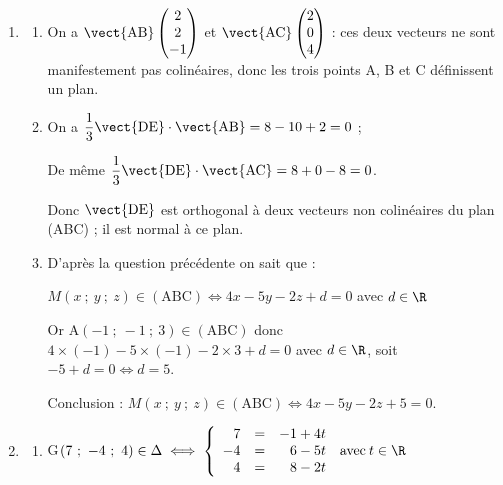 \begin{enumerate}
\begin{enumerate}
		\item 
		F$(1,36~;~-1,7~;~-0,7) \in\Delta' \iff \left\{\begin{array}{l c l}
1,36&=&\phantom{-}4t\\
-1,7&=&-5t \quad\text{avec}\: t \in \R\\
-0,7&=& -2t
\end{array}\right.$

Les deux premières équations donnent $t = 0,34$ et la dernière $t = 0,35$. \\
Donc F $\notin \Delta$.
	\end{enumerate}	
\item
	\begin{enumerate}
		\item 
		On a $\vect{\text{AB}}\begin{pmatrix}2\\2\\-1\end{pmatrix}$ et $\vect{\text{AC}}\begin{pmatrix}2\\0\\4\end{pmatrix}$ : ces deux vecteurs ne sont manifestement pas colinéaires, donc les trois points A, B et C définissent un plan.
		\item 
On a $\dfrac13\vect{\text{DE}} \cdot \vect{\text{AB}} = 8 - 10 + 2 = 0$ ;

De même $\dfrac13\vect{\text{DE}} \cdot \vect{\text{AC}} = 8 + 0 - 8 = 0$.

Donc $\vect{\text{DE}}$ est orthogonal à deux vecteurs non colinéaires du plan (ABC) ; il est normal à ce plan.

		\item 
		
D'après la question précédente on sait que :

$M(x~;~y~;~z) \in (\text{ABC}) \iff 4x - 5y - 2z + d = 0$ avec $d \in \R$

Or A$(- 1~;~-1~;~3) \in (\text{ABC})$ donc $4\times (-1) - 5\times (-1)  - 2\times 3  + d = 0$ avec $d \in \R$, soit $- 5 + d = 0 \iff d = 5$.

Conclusion : $M(x~;~y~;~z) \in (\text{ABC}) \iff 4x - 5y - 2z + 5 = 0$.
	\end{enumerate}
\item
	\begin{enumerate}
		\item 
		G$(7~;~-4~;~4) \in \Delta \iff \left\{\begin{array}{r c l}
7 &=& -1 + 4t\\
-4 &=& \phantom{-}6 - 5t \quad\text{avec}\: t \in \R\\
4 &=& \phantom{-}8 - 2t
\end{array}\right.$


\end{enumerate}
\end{enumerate}
